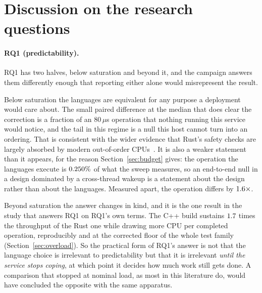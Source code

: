 \documentclass[english,twoside,openright,a4paper,censored,csm,software-track-2020]{HYthesisML}
\begin{document}
\section{Discussion on the research questions}\label{sec:rqdiscussion}
\paragraph{RQ1 (predictability).} RQ1 has two halves, below saturation and beyond it, and the
campaign answers them differently enough that reporting either alone would misrepresent the
result.

Below saturation the languages are equivalent for any purpose a deployment would care about. The
small paired difference at the median that does clear the correction is a fraction of an
$80\,\mu$s operation that nothing running this service would notice, and the tail in this regime
is a null this host cannot turn into an ordering. That is consistent with the wider evidence that
Rust's safety checks are largely absorbed by modern out-of-order
CPUs~\cite{emmerich2019drivers,balasubramanian2017rust}. It is also a weaker statement than it
appears, for the reason Section~\ref{sec:budget} gives: the operation the
languages execute is $0.250\%$ of what the sweep measures, so an end-to-end null in
a design dominated by a cross-thread wakeup is a statement about the design rather than about the
languages. Measured apart, the operation differs by $1.6\times$.

Beyond saturation the answer changes in kind, and it is the one result in the study that answers
RQ1 on RQ1's own terms. The C++ build sustains $1.7$ times the throughput of the
Rust one while drawing more CPU per completed operation, reproducibly and at the corrected floor
of the whole test family (Section~\ref{sec:overload}). So the practical form of RQ1's answer is
not that the language choice is irrelevant to predictability
but that it is irrelevant \emph{until the service stops coping}, at which point it decides how
much work still gets done. A comparison that stopped at nominal load, as most in this literature
do, would have concluded the opposite with the same apparatus.
\end{document}

